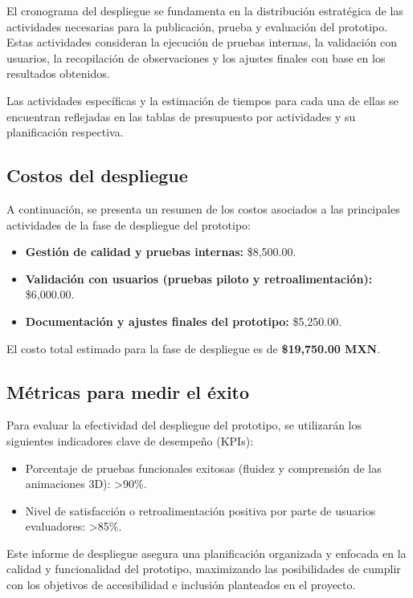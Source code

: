 El cronograma del despliegue se fundamenta en la distribución estratégica de las actividades necesarias para la publicación, prueba y evaluación del prototipo. Estas actividades consideran la ejecución de pruebas internas, la validación con usuarios, la recopilación de observaciones y los ajustes finales con base en los resultados obtenidos.

Las actividades específicas y la estimación de tiempos para cada una de ellas se encuentran reflejadas en las tablas de presupuesto por actividades y su planificación respectiva.

\subsection{Costos del despliegue}

A continuación, se presenta un resumen de los costos asociados a las principales actividades de la fase de despliegue del prototipo:

\begin{itemize}
	\item \textbf{Gestión de calidad y pruebas internas:} \$8,500.00.
	\item \textbf{Validación con usuarios (pruebas piloto y retroalimentación):} \$6,000.00.
	\item \textbf{Documentación y ajustes finales del prototipo:} \$5,250.00.
\end{itemize}

El costo total estimado para la fase de despliegue es de \textbf{\$19,750.00 MXN}.

\subsection{Métricas para medir el éxito}

Para evaluar la efectividad del despliegue del prototipo, se utilizarán los siguientes indicadores clave de desempeño (KPIs):

\begin{itemize}
	\item Porcentaje de pruebas funcionales exitosas (fluidez y comprensión de las animaciones 3D): \textgreater 90\%.
	\item Nivel de satisfacción o retroalimentación positiva por parte de usuarios evaluadores: \textgreater 85\%.
\end{itemize}

Este informe de despliegue asegura una planificación organizada y enfocada en la calidad y funcionalidad del prototipo, maximizando las posibilidades de cumplir con los objetivos de accesibilidad e inclusión planteados en el proyecto.

